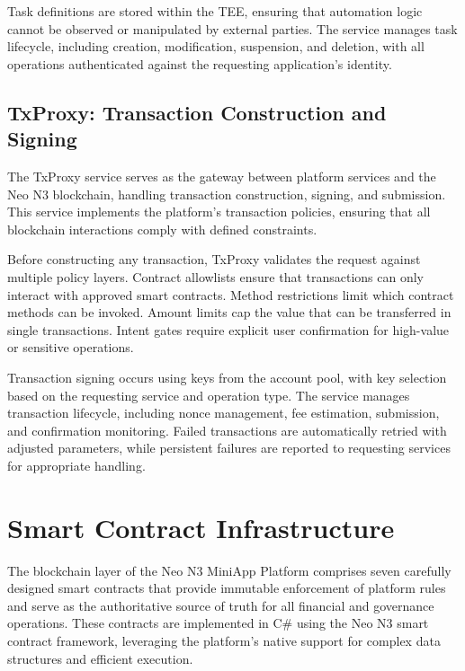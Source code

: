 \documentclass[11pt,a4paper]{article}
\begin{document}
Task definitions are stored within the TEE, ensuring that automation logic cannot be observed or manipulated by external parties. The service manages task lifecycle, including creation, modification, suspension, and deletion, with all operations authenticated against the requesting application's identity.

\subsection{TxProxy: Transaction Construction and Signing}

The TxProxy service serves as the gateway between platform services and the Neo N3 blockchain, handling transaction construction, signing, and submission. This service implements the platform's transaction policies, ensuring that all blockchain interactions comply with defined constraints.

Before constructing any transaction, TxProxy validates the request against multiple policy layers. Contract allowlists ensure that transactions can only interact with approved smart contracts. Method restrictions limit which contract methods can be invoked. Amount limits cap the value that can be transferred in single transactions. Intent gates require explicit user confirmation for high-value or sensitive operations.

Transaction signing occurs using keys from the account pool, with key selection based on the requesting service and operation type. The service manages transaction lifecycle, including nonce management, fee estimation, submission, and confirmation monitoring. Failed transactions are automatically retried with adjusted parameters, while persistent failures are reported to requesting services for appropriate handling.

\newpage
\section{Smart Contract Infrastructure}

The blockchain layer of the Neo N3 MiniApp Platform comprises seven carefully designed smart contracts that provide immutable enforcement of platform rules and serve as the authoritative source of truth for all financial and governance operations. These contracts are implemented in C\# using the Neo N3 smart contract framework, leveraging the platform's native support for complex data structures and efficient execution.
\end{document}
